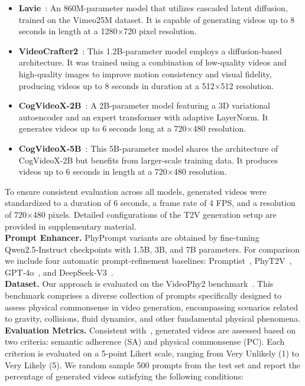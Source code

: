 \begin{itemize}
\item \textbf{Lavie}~\cite{wang2023lavie}: An 860M-parameter model that utilizes cascaded latent diffusion, trained on the Vimeo25M dataset. It is capable of generating videos up to 8 seconds in length at a 1280×720 pixel resolution.
\item \textbf{VideoCrafter2}~\cite{chen2024videocrafter2}: This 1.2B-parameter model employs a diffusion-based architecture. It was trained using a combination of low-quality videos and high-quality images to improve motion consistency and visual fidelity, producing videos up to 8 seconds in duration at a 512×512 resolution.
\item \textbf{CogVideoX-2B}~\cite{yang2024cogvideox}: A 2B-parameter model featuring a 3D variational autoencoder and an expert transformer with adaptive LayerNorm. It generates videos up to 6 seconds long at a 720×480 resolution.
\item \textbf{CogVideoX-5B}~\cite{yang2024cogvideox}: This 5B-parameter model shares the architecture of CogVideoX-2B but benefits from larger-scale training data. It produces videos up to 6 seconds in length at a 720×480 resolution.
\end{itemize}
To ensure consistent evaluation across all models, generated videos were standardized to a duration of 6 seconds, a frame rate of 4 FPS, and a resolution of 720×480 pixels. Detailed configurations of the T2V generation setup are provided in supplementary material.
\\
\textbf{Prompt Enhancer.}
PhyPrompt variants are obtained by fine‑tuning Qwen2.5‑Instruct checkpoints with 1.5B, 3B, and 7B parameters.
For comparison we include four automatic prompt‑refinement baselines: Promptist~\cite{hao2023promptist}, PhyT2V~\cite{xue2024phyt2v}, GPT‑4o~\cite{achiam2023gpt-4o}, and DeepSeek‑V3~\cite{liu2024deepseek-v3}.
\\
\textbf{Dataset.}
Our approach is evaluated on the VideoPhy2 benchmark~\cite{bansal2025videophy2}. This benchmark comprises a diverse collection of prompts specifically designed to assess physical commonsense in video generation, encompassing scenarios related to gravity, collisions, fluid dynamics, and other fundamental physical phenomena.
\\
\textbf{Evaluation Metrics.}
Consistent with~\cite{bansal2025videophy2}, generated videos are assessed based on two criteria: semantic adherence (SA) and physical commonsense (PC). Each criterion is evaluated on a 5-point Likert scale, ranging from Very Unlikely (1) to Very Likely (5). We random sample 500 prompts from the test set and report the percentage of generated videos satisfying the following conditions:

